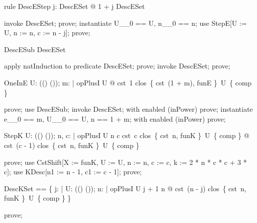 \documentclass{article}
\begin{document}
\begin{theorem}{rule DescEStep}
  \forall j: DescESet @ 1 + j \in DescESet
\end{theorem}

\begin{zproof}
invoke DescESet;
prove;
instantiate U\_\_0 == U, n\_\_0 == n;
use StepE[U := U, n := n, c := n - j];
prove;
\end{zproof}

\begin{theorem}{DescESub}
  \nat \subseteq DescESet
\end{theorem}

\begin{zproof}
apply natInduction to predicate \nat \subseteq DescESet;
prove;
invoke DescESet;
prove;
\end{zproof}

\begin{theorem}{OneInE}
  \forall U: \power ((\nat \fun \nat) \fun (\nat \fun \nat)); m: \nat | opPlusI \in U @ cst~1 \in clos~\{ cst~(1 + m), funE \}~U~\{ comp \}
\end{theorem}

\begin{zproof}
prove;
use DescESub;
invoke DescESet;
with enabled (inPower) prove;
instantiate e\_\_0 == m, U\_\_0 == U, n == 1 + m;
with enabled (inPower) prove;
\end{zproof}


\begin{theorem}{StepK}
  \forall U: \power ((\nat \fun \nat) \fun (\nat \fun \nat)); n, c: \nat | opPlusI \in U  \leq n  \leq c \land cst~c \in clos~\{ cst~n, funK \}~U~\{ comp \} @ cst~(c - 1) \in clos~\{ cst~n, funK \}~U~\{ comp \}
\end{theorem}

\begin{zproof}
prove;
use CstShift[X := funK, U := U, n := n, c := c, k := 2 * n * c * c + 3 * c];
use KDesc[n1 := n - 1, c1 := c - 1];
prove;
\end{zproof}

\begin{zed}
  DescKSet == \{ j: \nat | \forall U: \power ((\nat \fun \nat) \fun (\nat \fun \nat)); n: \nat | opPlusI \in U \land j + 1 \leq n @ cst~(n - j) \in clos~\{ cst~n, funK \}~U~\{ comp \} \}
\end{zed}

\begin{zproof}
prove;
\end{zproof}
\end{document}
